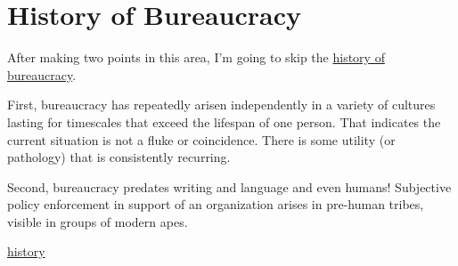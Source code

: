 \section{History of Bureaucracy}

After making two points in this area, I'm going to skip the \href{https://en.wikipedia.org/wiki/Bureaucracy#History}{history of bureaucracy}.  %

First, bureaucracy has repeatedly arisen independently in a variety of cultures lasting for timescales that exceed the lifespan of one person. That indicates the current situation is not a fluke or coincidence. There is some utility (or pathology) that is consistently recurring. 


Second, bureaucracy predates writing and language and even humans! Subjective policy enforcement in support of an organization arises in pre-human tribes, visible in groups of modern apes. 


\href{https://www.youtube.com/watch?v=B_nsZlcC12g}{history}